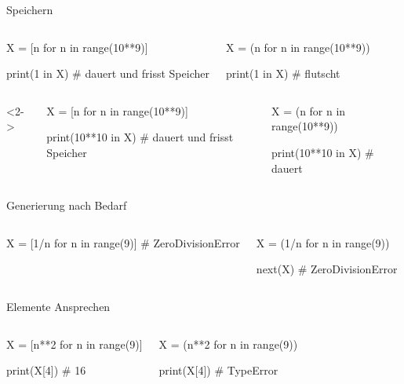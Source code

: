 \documentclass[xcolor=dvipsnames, aspectratio=169, 14pt]{beamer}
\begin{document}
\begin{frame}[fragile]{Speichern}
	\vspace{-\baselineskip}
	\begin{columns}%
	\begin{python3code}
	X = [n for n in range(10**9)]
	
	print(1 in X)
	# dauert und frisst Speicher
	\end{python3code}
	
	\begin{python3code}
	X = (n for n in range(10**9))
	
	print(1 in X)
	# flutscht
	\end{python3code}
	\end{columns}
	
	\vspace{-\baselineskip}
	
	\begin{columns}<2->%
	\column{0.5\linewidth}
	\begin{python3code}
	X = [n for n in range(10**9)]
	
	print(10**10 in X)
	# dauert und frisst Speicher
	\end{python3code}
	
	\column{0.5\linewidth}
	\begin{python3code}
	X = (n for n in range(10**9))
	
	print(10**10 in X)
	# dauert
	\end{python3code}
	\end{columns}
\end{frame}

\begin{frame}[fragile]{Generierung nach Bedarf}
	\begin{columns}%
	\column[t]{0.5\linewidth}
	\begin{python3code}
	X = [1/n for n in range(9)]
	# ZeroDivisionError
	\end{python3code}
	
	\column[t]{0.5\linewidth}
	\begin{python3code}
	X = (1/n for n in range(9))
	
	next(X)
	# ZeroDivisionError
	\end{python3code}
	\end{columns}
\end{frame}


\begin{frame}[fragile]{Elemente Ansprechen}
	\begin{columns}%
	\begin{python3code}
	X = [n**2 for n in range(9)]
	
	print(X[4])
	# 16
	\end{python3code}
	
	\begin{python3code}
	X = (n**2 for n in range(9))
	
	print(X[4])
	# TypeError
	\end{python3code}
	\end{columns}
\end{frame}
\end{document}
